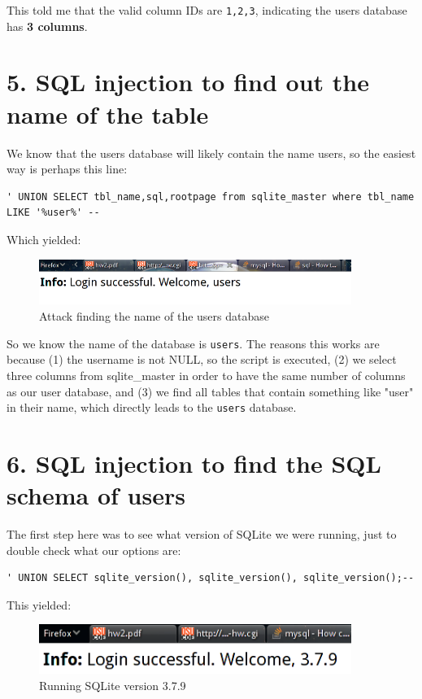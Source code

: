 \documentclass[12pt,letterpaper]{article}
\begin{document}
This told me that the valid column IDs are \verb!1,2,3!, indicating the
users database has \textbf{3 columns}.

\section*{5. SQL injection to find out the name of the table}
We know that the users database will likely contain the name users, so the
easiest way is perhaps this line:
\begin{verbatim}
' UNION SELECT tbl_name,sql,rootpage from sqlite_master where tbl_name LIKE '%user%' --
\end{verbatim}

Which yielded:
\begin{figure}[H]
	\centering
	\includegraphics[width=4in]{attempt4.png}
	\caption{Attack finding the name of the users database}
\end{figure}

So we know the name of the database is \verb!users!. The reasons this works
are because (1) the username is not NULL, so the script is executed, (2)
we select three columns from sqlite\_master in order to have the same
number of columns as our user database, and (3) we find all tables that
contain something like "user" in their name, which directly leads to the
\verb~users~ database.

\section*{6. SQL injection to find the SQL schema of users}
The first step here was to see what version of SQLite we were running, just
to double check what our options are:
\begin{verbatim}
' UNION SELECT sqlite_version(), sqlite_version(), sqlite_version();--
\end{verbatim}

This yielded:
\begin{figure}[H]
	\centering
	\includegraphics[width=4in]{version.png}
	\caption{Running SQLite version 3.7.9}
\end{figure}
\end{document}
